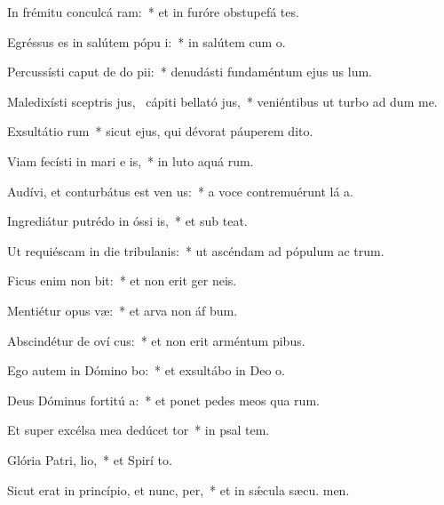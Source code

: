 \item In frémitu conculcá ram:~* et in furóre obstupefá tes.
\item Egréssus es in salútem pópu i:~* in salútem cum  o.
\item Percussísti caput de do pii:~* denudásti fundaméntum ejus us  lum.
\item Maledixísti sceptris jus,~\pscross{} cápiti bellató jus,~* veniéntibus ut turbo ad dum me.
\item Exsultátio rum~* sicut ejus, qui dévorat páuperem  dito.
\item Viam fecísti in mari e is,~* in luto aquá rum.
\item Audívi, et conturbátus est ven us:~* a voce contremuérunt lá a.
\item Ingrediátur putrédo in óssi is,~* et sub  teat.
\item Ut requiéscam in die tribulanis:~* ut ascéndam ad pópulum ac trum.
\item Ficus enim non bit:~* et non erit ger  neis.
\item Mentiétur opus væ:~* et arva non áf bum.
\item Abscindétur de oví cus:~* et non erit arméntum  pibus.
\item Ego autem in Dómino bo:~* et exsultábo in Deo  o.
\item Deus Dóminus fortitú a:~* et ponet pedes meos qua rum.
\item Et super excélsa mea dedúcet  tor~* in psal tem.
\item Glória Patri,  lio,~* et Spirí to.
\item Sicut erat in princípio, et nunc,  per,~* et in sǽcula sæcu. men.
